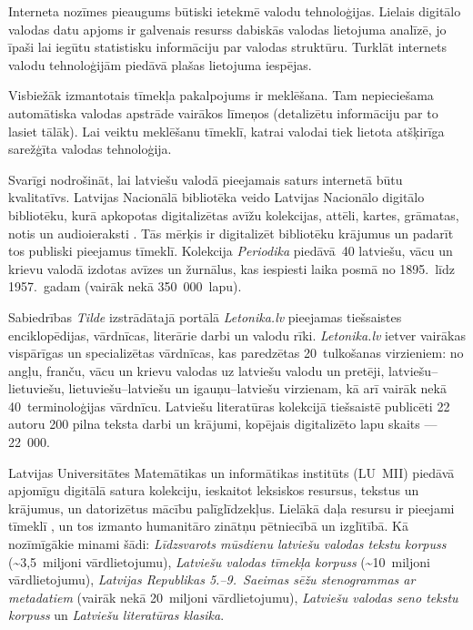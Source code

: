 \begin{multicols}{2}
Interneta nozīmes pieaugums būtiski ietekmē valodu tehnoloģijas. 
Lielais digitālo valodas datu apjoms ir galvenais resurss dabiskās valodas lietojuma analīzē, jo īpaši lai iegūtu statistisku informāciju par valodas struktūru.
Turklāt internets valodu tehnoloģijām piedāvā plašas lietojuma iespējas. 

Visbiežāk izmantotais tīmekļa pakalpojums ir meklēšana.
Tam nepieciešama automātiska valodas apstrāde vairākos līmeņos (detalizētu informāciju par to lasiet tālāk).
Lai veiktu meklēšanu tīmeklī, katrai valodai tiek lietota atšķirīga sarežģīta valodas tehnoloģija.

Svarīgi nodrošināt, lai latviešu valodā pieejamais saturs internetā būtu kvalitatīvs.
Latvijas Nacionālā bibliotēka veido Latvijas Nacionālo digitālo bibliotēku, kurā apkopotas digitalizētas avīžu kolekcijas, attēli, kartes, grāmatas, notis un audioieraksti \cite{Meta6}.
Tās mērķis ir digitalizēt bibliotēku krājumus un padarīt tos publiski pieejamus tīmeklī.
Kolekcija \textit{Periodika} piedāvā~40 latviešu, vācu un krievu valodā izdotas avīzes un žurnālus, kas iespiesti laika posmā no 1895.~līdz 1957.~gadam (vairāk nekā 350~000~lapu).

Sabiedrības \textit{Tilde} izstrādātajā portālā \textit{Letonika.lv} pieejamas tiešsaistes enciklopēdijas, vārdnīcas, literārie darbi un valodu rīki.
\textit{Letonika.lv} ietver vairākas vispārīgas un specializētas vārdnīcas, kas paredzētas 20~tulkošanas virzieniem: no angļu, franču, vācu un krievu valodas uz latviešu valodu un pretēji, latviešu--lietuviešu, lietuviešu--latviešu un igauņu--latviešu virzienam, kā arī vairāk nekā 40~terminoloģijas vārdnīcu.
Latviešu literatūras kolekcijā tiešsaistē publicēti 22 autoru 200 pilna teksta darbi un krājumi, kopējais digitalizēto lapu skaits — 22~000.

Latvijas Universitātes Matemātikas un informātikas institūts (LU~MII) piedāvā apjomīgu digitālā satura kolekciju, ieskaitot leksiskos resursus, tekstus un krājumus, un datorizētus mācību palīglīdzekļus.
Lielākā daļa resursu ir pieejami tīmeklī \cite{Meta7}, un tos izmanto humanitāro zinātņu pētniecībā un izglītībā.
Kā nozīmīgākie minami šādi: \textit{Līdzsvarots mūsdienu latviešu valodas tekstu korpuss} \cite{Meta8} ${}^{ }$(\~{}3,5~miljoni vārdlietojumu), \textit{Latviešu valodas tīmekļa korpuss} (\~{}10~miljoni vārdlietojumu), \textit{Latvijas Republikas 5.--9.~Saeimas sēžu stenogrammas ar metadatiem} (vairāk nekā 20~miljoni vārdlietojumu), \textit{Latviešu valodas seno tekstu korpuss} \cite{Meta9} \cite{metaAndronova} un \textit{Latviešu literatūras klasika}.


\end{multicols}
